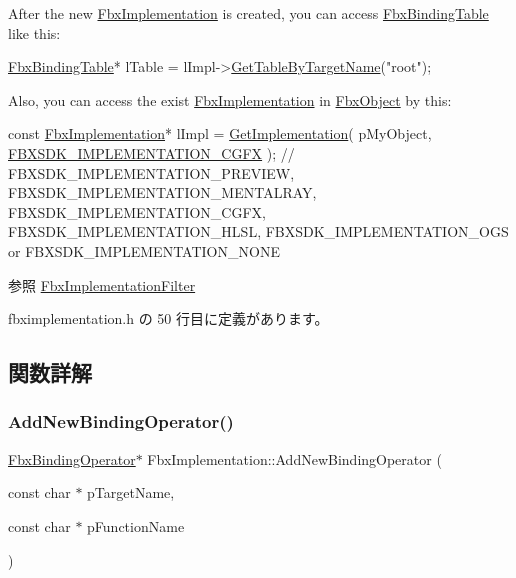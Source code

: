 After the new \hyperlink{class_fbx_implementation}{Fbx\+Implementation} is created, you can access \hyperlink{class_fbx_binding_table}{Fbx\+Binding\+Table} like this\+: 
\begin{DoxyCode}
\hyperlink{class_fbx_binding_table}{FbxBindingTable}* lTable = lImpl->\hyperlink{class_fbx_implementation_a45821c1d329404af513665d9809bab69}{GetTableByTargetName}(\textcolor{stringliteral}{"root"});
\end{DoxyCode}
 Also, you can access the exist \hyperlink{class_fbx_implementation}{Fbx\+Implementation} in \hyperlink{class_fbx_object}{Fbx\+Object} by this\+: 
\begin{DoxyCode}
\textcolor{keyword}{const} \hyperlink{class_fbx_implementation}{FbxImplementation}* lImpl = \hyperlink{class_fbx_object_a396d7a8496c2eef786ce73bac59ab55a}{GetImplementation}( pMyObject, 
      \hyperlink{fbxshadingconventions_8h_aa61dfbcf9b694b8a4f189c6a77c2c2b6}{FBXSDK\_IMPLEMENTATION\_CGFX} ); \textcolor{comment}{// FBXSDK\_IMPLEMENTATION\_PREVIEW,
       FBXSDK\_IMPLEMENTATION\_MENTALRAY, FBXSDK\_IMPLEMENTATION\_CGFX, FBXSDK\_IMPLEMENTATION\_HLSL, FBXSDK\_IMPLEMENTATION\_OGS or
       FBXSDK\_IMPLEMENTATION\_NONE}
\end{DoxyCode}


\begin{DoxySeeAlso}{参照}
\hyperlink{class_fbx_implementation_filter}{Fbx\+Implementation\+Filter} 
\end{DoxySeeAlso}


 fbximplementation.\+h の 50 行目に定義があります。



\subsection{関数詳解}
\mbox{\label{class_fbx_implementation_abc8cd44b869458fd075729c26efcafd9}} 
\subsubsection{\texorpdfstring{Add\+New\+Binding\+Operator()}{AddNewBindingOperator()}}
{\footnotesize\ttfamily \hyperlink{class_fbx_binding_operator}{Fbx\+Binding\+Operator}$\ast$ Fbx\+Implementation\+::\+Add\+New\+Binding\+Operator (\begin{DoxyParamCaption}\item[{const char $\ast$}]{p\+Target\+Name,  }\item[{const char $\ast$}]{p\+Function\+Name }\end{DoxyParamCaption})}

